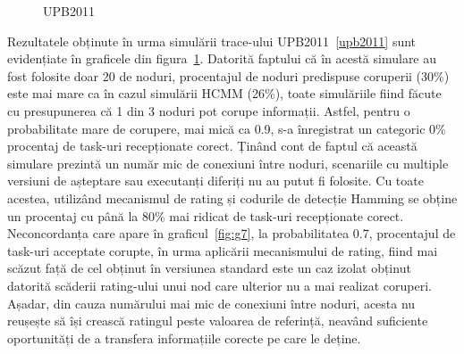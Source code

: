 \documentclass[12pt,a4paper]{report}
\begin{document}
\begin{figure}%
    \centering
    \qquad
    \caption{UPB2011}%
    \label{fig:metric12UPB2011}%
\end{figure}

Rezultatele obținute în urma simulării trace-ului UPB2011~\ref{upb2011} sunt evidențiate în graficele din figura~\ref{fig:metric12UPB2011}. Datorită faptului că în acestă simulare au fost folosite doar 20 de noduri, procentajul de noduri predispuse coruperii (30\%) este mai mare ca în cazul simulării HCMM (26\%), toate simulăriile fiind făcute cu presupunerea că 1 din 3 noduri pot corupe informații. Astfel, pentru o probabilitate mare de corupere, mai mică ca 0.9, s-a înregistrat un categoric 0\% procentaj de task-uri recepționate corect. Ținând cont de faptul că această simulare prezintă un număr mic de conexiuni între noduri, scenariile cu multiple versiuni de așteptare sau executanți diferiți nu au putut fi folosite. Cu toate acestea, utilizând mecanismul de rating și codurile de detecție Hamming se obține un procentaj cu până la 80\% mai ridicat de task-uri recepționate corect. Neconcordanța care apare în graficul~\ref{fig:g7}, la probabilitatea 0.7, procentajul de task-uri acceptate corupte, în urma aplicării mecanismului de rating, fiind mai scăzut față de cel obținut în versiunea standard este un caz izolat obținut datorită scăderii rating-ului unui nod care ulterior nu a mai realizat coruperi. Așadar, din cauza numărului mai mic de conexiuni între noduri, acesta nu reușește să își crească ratingul peste valoarea de referință, neavând suficiente oportunități de a transfera informațiile corecte pe care le deține.
\end{document}
